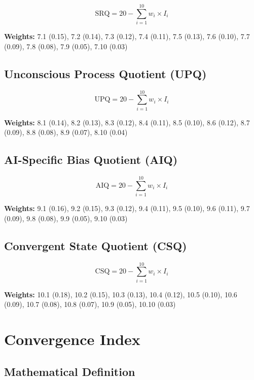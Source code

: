 \documentclass[11pt,a4paper]{article}
\begin{document}
\begin{equation}
\text{SRQ} = 20 - \sum_{i=1}^{10} w_i \times I_i
\end{equation}

\textbf{Weights:} 7.1 (0.15), 7.2 (0.14), 7.3 (0.12), 7.4 (0.11), 7.5 (0.13), 7.6 (0.10), 7.7 (0.09), 7.8 (0.08), 7.9 (0.05), 7.10 (0.03)

\subsection{Unconscious Process Quotient (UPQ)}

\begin{equation}
\text{UPQ} = 20 - \sum_{i=1}^{10} w_i \times I_i
\end{equation}

\textbf{Weights:} 8.1 (0.14), 8.2 (0.13), 8.3 (0.12), 8.4 (0.11), 8.5 (0.10), 8.6 (0.12), 8.7 (0.09), 8.8 (0.08), 8.9 (0.07), 8.10 (0.04)

\subsection{AI-Specific Bias Quotient (AIQ)}

\begin{equation}
\text{AIQ} = 20 - \sum_{i=1}^{10} w_i \times I_i
\end{equation}

\textbf{Weights:} 9.1 (0.16), 9.2 (0.15), 9.3 (0.12), 9.4 (0.11), 9.5 (0.10), 9.6 (0.11), 9.7 (0.09), 9.8 (0.08), 9.9 (0.05), 9.10 (0.03)

\subsection{Convergent State Quotient (CSQ)}

\begin{equation}
\text{CSQ} = 20 - \sum_{i=1}^{10} w_i \times I_i
\end{equation}

\textbf{Weights:} 10.1 (0.18), 10.2 (0.15), 10.3 (0.13), 10.4 (0.12), 10.5 (0.10), 10.6 (0.09), 10.7 (0.08), 10.8 (0.07), 10.9 (0.05), 10.10 (0.03)

\section{Convergence Index}

\subsection{Mathematical Definition}
\end{document}
